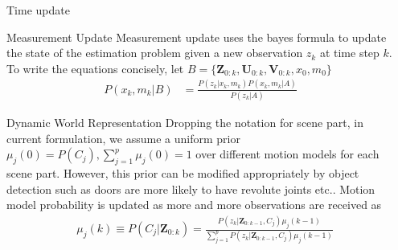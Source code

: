 \documentclass[final]{beamer}
\newlength{\sepwid}
\newlength{\onecolwid}
\begin{document}
\begin{frame}[t]
\begin{columns}[t]
\begin{column}{\onecolwid}
\begin{block}{Time update}
      \end{block}
      \begin{block} {Measurement Update} Measurement update uses the bayes formula to update the state of the estimation problem given a new observation $z_k$ at time step $k$. To write the equations concisely, let $B =\{ \mathbf{Z}_{0:k},\mathbf{U}_{0:k},\mathbf{V}_{0:k},x_0,m_0 \}$
        \begin{align}
          P(x_k,m_k|B) %
          &=\frac{P(z_k|x_k,m_k)P(x_k,m_k|A)}{P(z_k|A)}
          \label{eq:measurement_update}
        \end{align}

      \end{block}

      \begin{block}{Dynamic World Representation} 
        Dropping the notation for scene part, in current formulation, we assume a uniform prior $\mu_j(0) = P(C_j), \sum_{j=1}^{p}\mu_j(0) = 1$ over different motion models for each scene part. However, this prior can be modified appropriately by object detection such as doors are more likely to have revolute joints etc.. Motion model probability is updated as more and more observations are received \cite{yaakov2001estimation} as 
        \begin{align*}
          & \mu_j(k) \equiv P(C_j|\mathbf{Z}_{0:k})  = 
          \frac{P(z_k|\mathbf{Z}_{0:k-1}, C_j)\mu_j(k-1)}{\sum_{j=1}^{p} P(z_k|\mathbf{Z}_{0:k-1}, C_j)\mu_j(k-1) }
        \end{align*}
      \end{block}




    \end{column}


  \hspace{-\sepwid}
    \begin{column}{\onecolwid}


\end{column}
\end{columns}
\end{frame}
\end{document}
